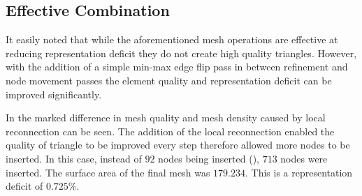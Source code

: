 \subsection{Effective Combination}
It easily noted that while the aforementioned mesh operations are
effective at reducing representation deficit they do not create high
quality triangles.  However, with the addition of a simple min-max edge
flip pass in between refinement and node movement passes the element
quality and representation deficit can be improved significantly.

\begin{figure}[h!]
  \begin{center}
  \label{fig_NodeSmoothing}
 
  \end{center}
\end{figure}

In  the marked difference in mesh quality and mesh
density caused by local reconnection can be seen. The addition of the
local reconnection enabled the quality of triangle to be improved every
step therefore allowed more nodes to be inserted. In this case, instead
of $92$ nodes being inserted (), $713$ nodes were
inserted. The surface area of the final mesh was $179.234$. This is a
representation deficit of $0.725\%$.
